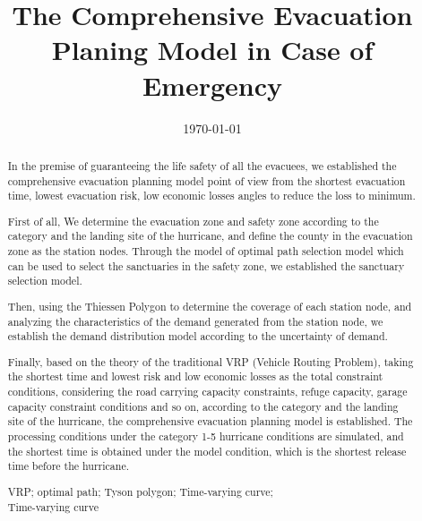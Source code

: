 \documentclass{mcmthesis}
\title{\large The Comprehensive Evacuation Planing Model in Case of Emergency}
\author{ }
\date{\today}
\begin{document}
\begin{abstract}

In the premise of guaranteeing the life safety of all the evacuees, we established the comprehensive evacuation planning model point of view from the shortest evacuation time, lowest evacuation risk, low economic losses angles to reduce the loss to minimum.

First of all, We determine the evacuation zone and safety zone according to the category and the landing site of the hurricane, and define the county in the evacuation zone as the station nodes. Through the model of optimal path selection model which can be used to select the sanctuaries in the safety zone, we established the sanctuary selection model.

Then, using the Thiessen Polygon to determine the coverage of each station node, and analyzing the characteristics of the demand generated from the station node, we establish the demand distribution model according to the uncertainty of demand.

Finally, based on the theory of the traditional VRP (Vehicle Routing Problem), taking the shortest time and lowest risk and low economic losses as the total constraint conditions, considering the road carrying capacity constraints, refuge capacity, garage capacity constraint conditions and so on, according to the category and the landing site of the hurricane, the comprehensive evacuation planning model is established. The processing conditions under the category 1-5 hurricane conditions are simulated, and the shortest time is obtained under the model condition, which is the shortest release time before the hurricane.


\begin{keywords}
VRP; optimal path; Tyson polygon; Time-varying curve; \\ \hspace*{1.2cm}Time-varying curve
\end{keywords}
\end{abstract}
\maketitle
\newpage                                                          %
\begin{adjustwidth}{-1cm}{0cm}

\setcounter{tocdepth}{3}
\thispagestyle{empty}
\tableofcontents                                                  %

\end{adjustwidth}
\end{document}
